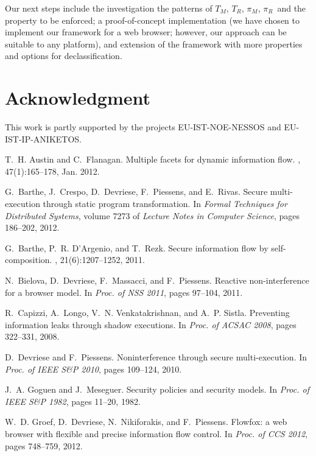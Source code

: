 \documentclass[10pt,a4paper,oneside]{article}
\def\ProgM{\ensuremath{\Prog_{M}}}
\def\ProgR{\ensuremath{\Prog_{R}}}
\def\TAV{\ensuremath{T_{M}}}
\def\TPV{\ensuremath{T_{R}}}
\def\Prog{\ensuremath{\pi}}
\begin{document}
Our next steps include the investigation the patterns of \TAV, \TPV, \ProgM, \ProgR\ and the property to be enforced; a proof-of-concept implementation (we have chosen to implement our framework for a web browser; however, our approach can be suitable to any platform), and extension of the framework with more properties and options for declassification.

\section*{Acknowledgment}
This work is partly supported by the projects EU-IST-NOE-NESSOS and EU-IST-IP-ANIKETOS.


\newpage
\begin{thebibliography}{10}

T.~H. Austin and C.~Flanagan.
\newblock Multiple facets for dynamic information flow.
, 47(1):165--178, Jan. 2012.

G.~Barthe, J.~Crespo, D.~Devriese, F.~Piessens, and E.~Rivas.
\newblock Secure multi-execution through static program transformation.
\newblock In {\em Formal Techniques for Distributed Systems}, volume 7273 of
  {\em Lecture Notes in Computer Science}, pages 186--202, 2012.

G.~Barthe, P.~R. D'Argenio, and T.~Rezk.
\newblock Secure information flow by self-composition.
, 21(6):1207--1252,
  2011.

N.~Bielova, D.~Devriese, F.~Massacci, and F.~Piessens.
\newblock Reactive non-interference for a browser model.
\newblock In {\em Proc. of NSS 2011}, pages 97--104, 2011.

R.~Capizzi, A.~Longo, V.~N. Venkatakrishnan, and A.~P. Sistla.
\newblock Preventing information leaks through shadow executions.
\newblock In {\em Proc. of ACSAC 2008}, pages 322--331, 2008.

D.~Devriese and F.~Piessens.
\newblock Noninterference through secure multi-execution.
\newblock In {\em Proc. of IEEE S\&P 2010}, pages 109--124, 2010.

J.~A. Goguen and J.~Meseguer.
\newblock Security policies and security models.
\newblock In {\em Proc. of IEEE S\&P 1982}, pages 11--20, 1982.

W.~D. Groef, D.~Devriese, N.~Nikiforakis, and F.~Piessens.
\newblock Flowfox: a web browser with flexible and precise information flow
  control.
\newblock In {\em Proc. of CCS 2012}, pages 748--759, 2012.


\end{thebibliography}
\end{document}
